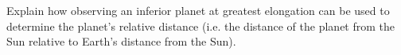 \documentclass[main.tex]{subfiles}
\begin{document}
\begin{q}{1}
Explain how observing an inferior planet at greatest elongation can be used to
determine the planet's relative distance (i.e. the distance of the planet from
the Sun relative to Earth's distance from the Sun).
\end{q}

\begin{sol}

\end{sol}
\end{document}
